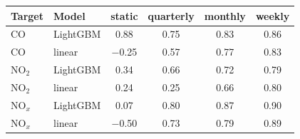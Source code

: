 \begin{tabular}{llcccc}
\toprule
Target & Model & static & quarterly & monthly & weekly\\
\midrule
CO & LightGBM & 0.88 & 0.75 & 0.83 & 0.86\\
CO & linear & $-$0.25 & 0.57 & 0.77 & 0.83\\
NO$_2$ & LightGBM & 0.34 & 0.66 & 0.72 & 0.79\\
NO$_2$ & linear & 0.24 & 0.25 & 0.66 & 0.80\\
NO$_x$ & LightGBM & 0.07 & 0.80 & 0.87 & 0.90\\
NO$_x$ & linear & $-$0.50 & 0.73 & 0.79 & 0.89\\
\bottomrule
\end{tabular}
